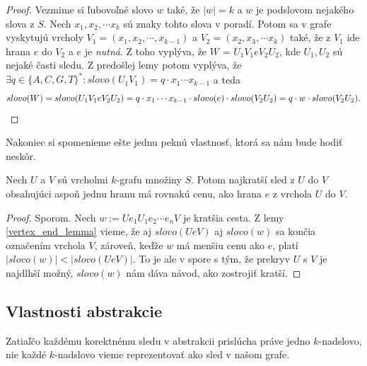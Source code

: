\begin{proof}
Vezmime si ľubovoľné slovo $w$ také, že $|w| = k$ a $w$ je podslovom nejakého slova z $S$. Nech $x_1, x_2, \cdots x_k$
sú znaky tohto slova v poradí. Potom sa v grafe vyskytujú vrcholy $V_1 = (x_1, x_2, \cdots, x_{k-1})$ a $V_2 = (x_2, x_3, \cdots x_k)$ také,
že z $V_1$ ide hrana $e$ do $V_2$ a $e$ je \emph{nutná}. Z toho vyplýva, že $W$ = $U_1 V_1 e V_2 U_2$, kde $U_1, U_2$ sú nejaké časti sledu.
Z predošlej lemy potom vyplýva, že $\exists q \in \{A,C,G,T \}^*: slovo(U_1 V_1) =  q \cdot x_1 \cdots x_{k - 1}$ a teda
$$slovo(W) = slovo(U_1 V_1 e V_2 U_2) = q \cdot x_1 \cdots x_{k - 1} \cdot slovo(e) \cdot slovo (V_2 U_2) = q \cdot w \cdot slovo(V_2 U_2).\qedhere$$
\end{proof}

Nakoniec si spomenieme ešte jednu peknú vlastnosť, ktorá sa nám bude hodiť neskôr.

\begin{lema}
\label{shortest_edge_lemma}
    Nech $U$ a $V$ sú vrcholmi $k$-grafu množiny $S$. Potom najkratší sled z $U$
    do $V$ obsahujúci aspoň jednu hranu má rovnakú cenu, ako hrana $e$ z vrchola $U$ do $V$.
\end{lema}

\begin{proof}
    Sporom. Nech $w := U e_1 U_1 e_2 \cdots e_n V$ je kratšia cesta. Z lemy \ref{vertex_end_lemma} vieme,
    že aj $slovo(U e V)$ aj $slovo(w)$ sa končia označením vrchola $V$, zároveň, keďže $w$ má
    menšiu cenu ako $e$, platí $|slovo(w)| < |slovo(U e V)|$. To je ale v spore s tým, že prekryv
    $U$ s $V$ je najdlhší možný, $slovo(w)$ nám dáva návod, ako zostrojiť kratší.
\end{proof}

\subsection{Vlastnosti abstrakcie}

Zatiaľčo každému korektnému sledu v abstrakcii prislúcha práve jedno $k$-nadslovo, nie
každé $k$-nadslovo vieme reprezentovať ako sled v našom grafe.

